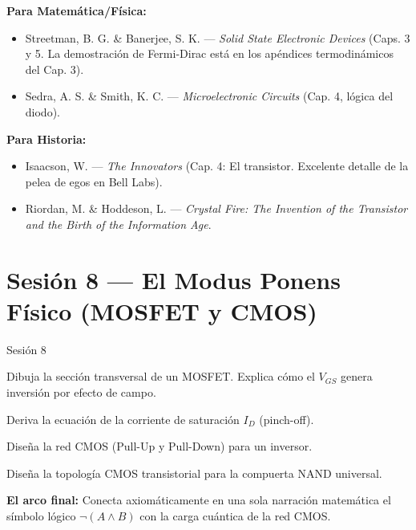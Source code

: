 \documentclass[11pt, letterpaper]{article}
\begin{document}
\begin{referencias}
\textbf{Para Matem\'atica/F\'isica:}
\begin{itemize}
    \item Streetman, B. G. \& Banerjee, S. K. --- \textit{Solid State Electronic Devices} (Caps. 3 y 5. La demostraci\'on de Fermi-Dirac est\'a en los ap\'endices termodin\'amicos del Cap. 3).
    \item Sedra, A. S. \& Smith, K. C. --- \textit{Microelectronic Circuits} (Cap. 4, l\'ogica del diodo).
\end{itemize}
\textbf{Para Historia:}
\begin{itemize}
    \item Isaacson, W. --- \textit{The Innovators} (Cap. 4: El transistor. Excelente detalle de la pelea de egos en Bell Labs).
    \item Riordan, M. \& Hoddeson, L. --- \textit{Crystal Fire: The Invention of the Transistor and the Birth of the Information Age}.
\end{itemize}
\end{referencias}

\newpage

\section{Sesi\'on 8 --- El Modus Ponens F\'isico (MOSFET y CMOS)}

\begin{verificacion}{Sesi\'on 8}
\begin{checklist}
  \item Dibuja la secci\'on transversal de un MOSFET. Explica c\'omo el $V_{GS}$ genera inversi\'on por efecto de campo.
  \item Deriva la ecuaci\'on de la corriente de saturaci\'on $I_D$ (pinch-off).
  \item Dise\~na la red CMOS (Pull-Up y Pull-Down) para un inversor.
  \item Dise\~na la topolog\'ia CMOS transistorial para la compuerta NAND universal.
  \item \textbf{El arco final:} Conecta axiom\'aticamente en una sola narraci\'on matem\'atica el s\'imbolo l\'ogico $\neg(A \land B)$ con la carga cu\'antica de la red CMOS.
\end{checklist}
\end{verificacion}
\end{document}
